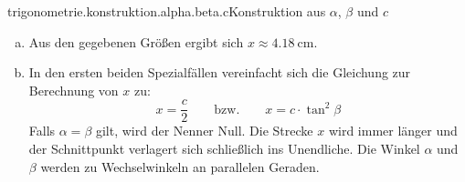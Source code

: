 \begin{exercise}{trigonometrie.konstruktion.alpha.beta.c}{Konstruktion aus $\alpha$, $\beta$ und $c$}
\begin{enumerate}[a)]
\begin{equation*}
              x=c\cdot\frac{\sin^{2}\beta}{\sin(\alpha+\beta)\cdot\sin(\alpha-\beta)}
            \end{equation*}
      \item Aus den gegebenen Größen ergibt sich $x\approx\SI{4.18}{\centi\metre}$.
      \item In den ersten beiden Spezialfällen vereinfacht sich die Gleichung
            zur Berechnung von $x$ zu:
            \begin{equation*}
              x=\frac{c}{2}\qquad\text{bzw.}\qquad x=c\cdot\tan^{2}\beta
            \end{equation*}
            Falls $\alpha=\beta$ gilt, wird der Nenner Null. Die Strecke $x$
            wird immer länger und der Schnittpunkt verlagert sich schließlich
            ins Unendliche. Die Winkel $\alpha$ und $\beta$ werden zu
            Wechselwinkeln an parallelen Geraden.
    \end{enumerate}
  \fi
\end{exercise}
